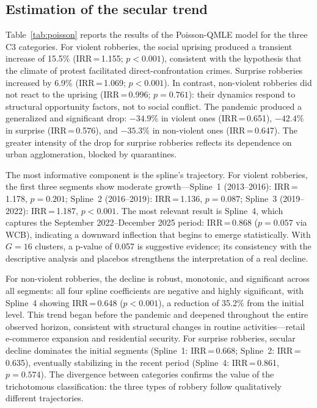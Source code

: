 \documentclass[pdflatex,sn-basic]{sn-jnl}
\begin{document}
\subsection{Estimation of the secular trend}
\label{sub:inferencial}

Table~\ref{tab:poisson} reports the results of the Poisson-QMLE model for the
three C3 categories. For violent robberies, the social uprising produced a transient
increase of 15.5\% (IRR\,=\,1.155; $p<0.001$), consistent with the hypothesis that
the climate of protest facilitated direct-confrontation crimes. Surprise robberies
increased by 6.9\% (IRR\,=\,1.069; $p<0.001$). In contrast, non-violent robberies
did not react to the uprising (IRR\,=\,0.996; $p=0.761$): their dynamics
respond to structural opportunity factors, not to social conflict. The
pandemic produced a generalized and significant drop: $-34.9\%$ in violent ones
(IRR\,=\,0.651), $-42.4\%$ in surprise (IRR\,=\,0.576), and $-35.3\%$ in non-violent ones
(IRR\,=\,0.647). The greater intensity of the drop for surprise robberies reflects its dependence
on urban agglomeration, blocked by quarantines.

The most informative component is the spline's trajectory. For violent robberies,
the first three segments show moderate growth---Spline~1 (2013--2016):
IRR\,=\,1.178, $p=0.201$; Spline~2 (2016--2019): IRR\,=\,1.136, $p=0.087$;
Spline~3 (2019--2022): IRR\,=\,1.187, $p<0.001$. The most relevant result is
Spline~4, which captures the September 2022--December 2025 period: IRR\,=\,0.868
($p=0.057$ via WCB), indicating a downward inflection that begins to emerge
statistically. With $G=16$ clusters, a p-value of 0.057 is suggestive evidence;
its consistency with the descriptive analysis and placebos strengthens the
interpretation of a real decline.

For non-violent robberies, the decline is robust, monotonic, and significant across all
segments: all four spline coefficients are negative and highly significant,
with Spline~4 showing IRR\,=\,0.648 ($p<0.001$), a reduction of 35.2\% from
the initial level. This trend began before the pandemic and deepened throughout
the entire observed horizon, consistent with structural changes in
routine activities---retail e-commerce expansion and residential security.
For surprise robberies, secular decline dominates the initial segments
(Spline~1: IRR\,=\,0.668; Spline~2: IRR\,=\,0.635), eventually stabilizing in the recent
period (Spline~4: IRR\,=\,0.861, $p=0.574$). The divergence between categories
confirms the value of the trichotomous classification: the three types of robbery follow
qualitatively different trajectories.
\end{document}
